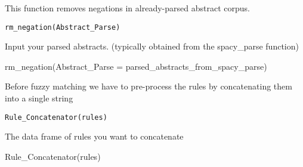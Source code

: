 \documentclass[a4paper]{book}
\begin{document}
%
\begin{Description}\relax
This function removes negations in already-parsed abstract corpus.
\end{Description}
%
\begin{Usage}
\begin{verbatim}
rm_negation(Abstract_Parse)
\end{verbatim}
\end{Usage}
%
\begin{Arguments}
\begin{ldescription}
\item[\code{Abstract\_Parse}] Input your parsed abstracts. (typically obtained from the spacy\_parse function)
\end{ldescription}
\end{Arguments}
%
\begin{Examples}
\begin{ExampleCode}
rm_negation(Abstract_Parse = parsed_abstracts_from_spacy_parse)
\end{ExampleCode}
\end{Examples}
%
\begin{Description}\relax
Before fuzzy matching we have to pre-process the rules by concatenating them into a single string
\end{Description}
%
\begin{Usage}
\begin{verbatim}
Rule_Concatenator(rules)
\end{verbatim}
\end{Usage}
%
\begin{Arguments}
\begin{ldescription}
\item[\code{rules}] The data frame of rules you want to concatenate
\end{ldescription}
\end{Arguments}
%
\begin{Examples}
\begin{ExampleCode}
Rule_Concatenator(rules)
\end{ExampleCode}
\end{Examples}
\end{document}
